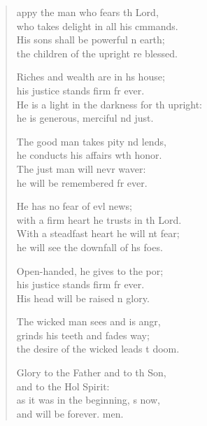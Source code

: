 \begin{verse}
  \begin{patverse}
appy the man who fears th Lord,\Med\\
who takes delight in all his cmmands.\\
His sons shall be powerful n earth;\Med\\
the children of the upright re blessed.

Riches and wealth are in hs house;\Med\\
his justice stands firm fr ever.\\
He is a light in the darkness for th upright:\Med\\
he is generous, merciful nd just.

The good man takes pity nd lends,\Med\\
he conducts his affairs wth honor.\\
The just man will nevr waver:\Med\\
he will be remembered fr ever.

He has no fear of evl news;\Med\\
with a firm heart he trusts in th Lord.\\
With a steadfast heart he will nt fear;\Med\\
he will see the downfall of hs foes.

Open-handed, he gives to the por;\Flex\\
his justice stands firm fr ever.\Med\\
His head will be raised n glory.

The wicked man sees and is angr,\Flex\\
grinds his teeth and fades way;\Med\\
the desire of the wicked leads t doom.

Glory to the Father and to th Son,\Med\\
and to the Hol Spirit:\\
as it was in the beginning, s now,\Med\\
and will be forever. men. 
  \end{patverse}
\end{verse}
